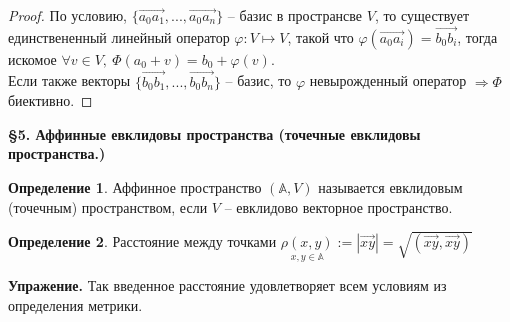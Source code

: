\documentclass[a4paper, 12pt]{article}
\theoremstyle{definition}
\newtheorem*{definition}{Определение}
\begin{document}
    \begin{proof}
        По условию, $\{\overrightarrow{a_0a_1},...,
        \overrightarrow{a_0a_n}\}$ -- базис в пространсве $V$,
        то существует единствененный линейный оператор 
        $\varphi:V \longmapsto V$, такой что $\varphi
        (\overrightarrow{a_0a_i}) = \overrightarrow{b_0b_i}$,
        тогда искомое $\forall v \in V,\  \Phi(a_0 + v) = 
        b_0 + \varphi(v)$.\\ Если также векторы $
        \{\overrightarrow
        {b_0b_1},...,\overrightarrow{b_0b_n}\}$ -- базис, то
        $\varphi$ невырожденный оператор $\Longrightarrow 
        \Phi$ биективно.
    \newpage
    \end{proof}
    \begin{center}
        \begin{Large}
            \textbf{\S5. Аффинные евклидовы пространства
            (точечные евклидовы пространства.)}
        \end{Large}
    \end{center}
    \begin{definition}
        Аффинное пространство $(\mathbb{A}, V)$ называется 
        евклидовым (точечным) пространством, если $V$ --
        евклидово векторное пространство.
    \end{definition}
    \begin{definition}
        Расстояние между точками $\underset{x,y \in \mathbb{A}}
        {\rho(x,y)} := |\overrightarrow
        {xy}| = \sqrt{(\overrightarrow{xy}, \overrightarrow
        {xy})}$
    \end{definition}
    \textbf{Упражение.} Так введенное расстояние удовлетворяет 
    всем условиям из определения метрики.
    
\end{document}
